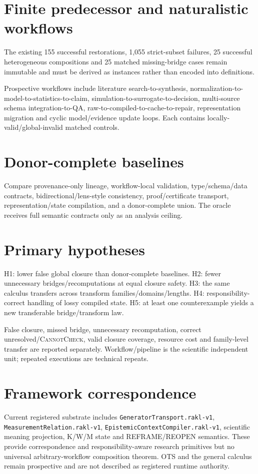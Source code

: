\documentclass[11pt]{article}
\begin{document}
\section{Finite predecessor and naturalistic workflows}
The existing 155 successful restorations, 1,055 strict-subset failures, 25 successful heterogeneous compositions and 25 matched missing-bridge cases remain immutable and must be derived as instances rather than encoded into definitions.

Prospective workflows include literature search-to-synthesis, normalization-to-model-to-statistics-to-claim, simulation-to-surrogate-to-decision, multi-source schema integration-to-QA, raw-to-compiled-to-cache-to-repair, representation migration and cyclic model/evidence update loops. Each contains locally-valid/global-invalid matched controls.

\section{Donor-complete baselines}
Compare provenance-only lineage, workflow-local validation, type/schema/data contracts, bidirectional/lens-style consistency, proof/certificate transport, representation/state compilation, and a donor-complete union. The oracle receives full semantic contracts only as an analysis ceiling.

\section{Primary hypotheses}
H1: lower false global closure than donor-complete baselines. H2: fewer unnecessary bridges/recomputations at equal closure safety. H3: the same calculus transfers across transform families/domains/lengths. H4: responsibility-correct handling of lossy compiled state. H5: at least one counterexample yields a new transferable bridge/transform law.

False closure, missed bridge, unnecessary recomputation, correct unresolved/\textsc{CannotCheck}, valid closure coverage, resource cost and family-level transfer are reported separately. Workflow/pipeline is the scientific independent unit; repeated executions are technical repeats.

\section{Framework correspondence}
Current registered substrate includes \texttt{GeneratorTransport.rakl-v1}, \texttt{MeasurementRelation.rakl-v1}, \texttt{EpistemicContextCompiler.rakl-v1}, scientific meaning projection, K/W/M state and REFRAME/REOPEN semantics. These provide correspondence and responsibility-aware research primitives but no universal arbitrary-workflow composition theorem. OTS and the general calculus remain prospective and are not described as registered runtime authority.
\end{document}
